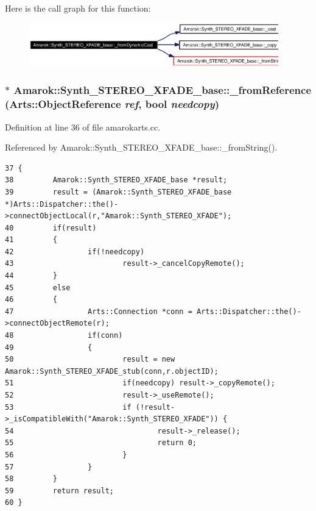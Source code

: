 Here is the call graph for this function:\begin{figure}[H]
\begin{center}
\leavevmode
\includegraphics[width=307pt]{classAmarok_1_1Synth__STEREO__XFADE__base_Amarok_1_1Synth__STEREO__XFADE__stube3_cgraph}
\end{center}
\end{figure}
\subsubsection{ $\ast$ Amarok::Synth\_\-STEREO\_\-XFADE\_\-base::\_\-from\-Reference (Arts::Object\-Reference {\em ref}, bool {\em needcopy})\hspace{0.3cm}{\tt  [static, inherited]}}\label{classAmarok_1_1Synth__STEREO__XFADE__base_Amarok_1_1Synth__STEREO__XFADE__stube2}




Definition at line 36 of file amarokarts.cc.

Referenced by Amarok::Synth\_\-STEREO\_\-XFADE\_\-base::\_\-from\-String().



\footnotesize\begin{verbatim}37 {
38         Amarok::Synth_STEREO_XFADE_base *result;
39         result = (Amarok::Synth_STEREO_XFADE_base *)Arts::Dispatcher::the()->connectObjectLocal(r,"Amarok::Synth_STEREO_XFADE");
40         if(result)
41         {
42                 if(!needcopy)
43                         result->_cancelCopyRemote();
44         }
45         else
46         {
47                 Arts::Connection *conn = Arts::Dispatcher::the()->connectObjectRemote(r);
48                 if(conn)
49                 {
50                         result = new Amarok::Synth_STEREO_XFADE_stub(conn,r.objectID);
51                         if(needcopy) result->_copyRemote();
52                         result->_useRemote();
53                         if (!result->_isCompatibleWith("Amarok::Synth_STEREO_XFADE")) {
54                                 result->_release();
55                                 return 0;
56                         }
57                 }
58         }
59         return result;
60 }
\end{verbatim}\normalsize 
{}
